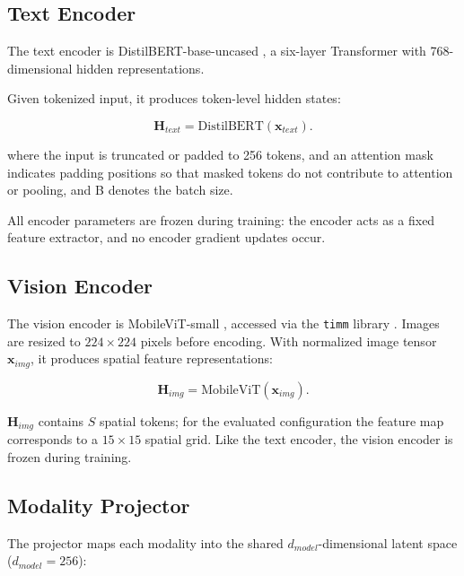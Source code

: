 \documentclass[10pt,twoside]{article}
\newcommand{\code}[1]{\texttt{#1}}
\begin{document}
\subsection{Text Encoder}\label{sec:5.2}

The text encoder is DistilBERT-base-uncased \citep{sanh2019distilbert}, a six-layer Transformer with 768-dimensional hidden representations.

Given tokenized input, it produces token-level hidden states:

\begin{equation}\label{eq:7}
\mathbf{H}_{text} = \text{DistilBERT}(\mathbf{x}_{text}).
\end{equation}

where the input is truncated or padded to 256 tokens, and an attention mask indicates padding positions so that masked tokens do not contribute to attention or pooling, and B denotes the batch size.

All encoder parameters are frozen during training: the encoder acts as a fixed feature extractor, and no encoder gradient updates occur.

\subsection{Vision Encoder}\label{sec:5.3}

The vision encoder is MobileViT-small \citep{mehta2022mobilevit}, accessed via the \code{timm} library \citep{wightman2019timm}. Images are resized to $224 \times 224$ pixels before encoding. With normalized image tensor $\mathbf{x}_{img}$, it produces spatial feature representations:

\begin{equation}\label{eq:8}
\mathbf{H}_{img} = \text{MobileViT}(\mathbf{x}_{img}).
\end{equation}

$\mathbf{H}_{img}$ contains $S$ spatial tokens; for the evaluated configuration the feature map corresponds to a $15 \times 15$ spatial grid. Like the text encoder, the vision encoder is frozen during training.

\subsection{Modality Projector}\label{sec:5.4}

The projector maps each modality into the shared $d_{model}$-dimensional latent space ($d_{model} = 256$):
\end{document}
